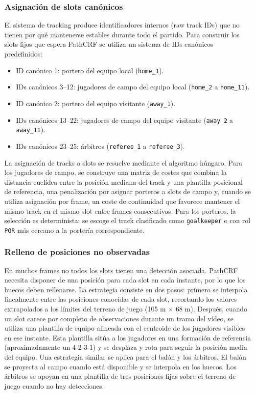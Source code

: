 \subsubsection{Asignación de slots canónicos}
El sistema de tracking produce identificadores internos (raw track IDs) que no tienen por qué mantenerse estables durante todo el partido. Para construir los slots fijos que espera PathCRF se utiliza un sistema de IDs canónicos predefinidos:
\begin{itemize}
    \item ID canónico 1: portero del equipo local (\texttt{home\_1}).
    \item IDs canónicos 3--12: jugadores de campo del equipo local (\texttt{home\_2} a \texttt{home\_11}).
    \item ID canónico 2: portero del equipo visitante (\texttt{away\_1}).
    \item IDs canónicos 13--22: jugadores de campo del equipo visitante (\texttt{away\_2} a \texttt{away\_11}).
    \item IDs canónicos 23--25: árbitros (\texttt{referee\_1} a \texttt{referee\_3}).
\end{itemize}
La asignación de tracks a slots se resuelve mediante el algoritmo húngaro. Para los jugadores de campo, se construye una matriz de costes que combina la distancia euclídea entre la posición mediana del track y una plantilla posicional de referencia, una penalización por asignar porteros a slots de campo y, cuando se utiliza asignación por frame, un coste de continuidad que favorece mantener el mismo track en el mismo slot entre frames consecutivos. Para los porteros, la selección es determinista: se escoge el track clasificado como \texttt{goalkeeper} o con rol \texttt{POR} más cercano a la portería correspondiente.
\subsubsection{Relleno de posiciones no observadas}
En muchos frames no todos los slots tienen una detección asociada. PathCRF necesita disponer de una posición para cada slot en cada instante, por lo que los huecos deben rellenarse. La estrategia consiste en dos pasos: primero se interpola linealmente entre las posiciones conocidas de cada slot, recortando los valores extrapolados a los límites del terreno de juego (105 m $\times$ 68 m). Después, cuando un slot carece por completo de observaciones durante un tramo del vídeo, se utiliza una plantilla de equipo alineada con el centroide de los jugadores visibles en ese instante. Esta plantilla sitúa a los jugadores en una formación de referencia (aproximadamente un 4-2-3-1) y se desplaza y rota para seguir la posición media del equipo.
Una estrategia similar se aplica para el balón y los árbitros. El balón se proyecta al campo cuando está disponible y se interpola en los huecos. Los árbitros se apoyan en una plantilla de tres posiciones fijas sobre el terreno de juego cuando no hay detecciones.

